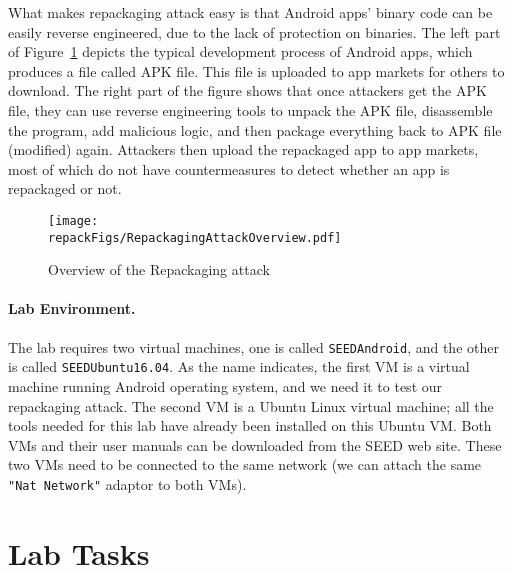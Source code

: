 What makes repackaging attack easy is that Android apps' binary code can be easily reverse 
engineered, due to the lack of protection on binaries.  
The left part of Figure~\ref{fig:repackaging:overview} depicts the typical
development process of Android apps, which produces a file called APK file.
This file is uploaded to app markets for others to download. 
The right part of the figure shows that once attackers get the APK
file, they can use reverse engineering tools to unpack the APK file, 
disassemble the program, add malicious logic, and then package
everything back to APK file (modified) again. 
Attackers then upload the repackaged app to app markets, most of which do
not have countermeasures to detect whether an app is repackaged or not.  


\begin{figure}[htb]
  \begin{center}
    \texttt{[image: \\repackFigs/RepackagingAttackOverview.pdf]}
  \end{center}
  \caption{Overview of the Repackaging attack}
  \label{fig:repackaging:overview}
\end{figure}

 
\paragraph{Lab Environment.}
The lab requires two virtual machines, one is called \texttt{SEEDAndroid}, and the other is called
\texttt{SEEDUbuntu16.04}. As the name indicates, the first VM is a virtual machine running Android
operating system, and we need it to test our repackaging attack. The second
VM is a Ubuntu Linux virtual machine; all the tools needed for
this lab have already been installed on this Ubuntu VM.
Both VMs and their user manuals can be downloaded from the SEED web site. These two VMs need to
be connected to the same network (we can attach the same \texttt{"Nat Network"} adaptor to both
VMs).







\section{Lab Tasks}




